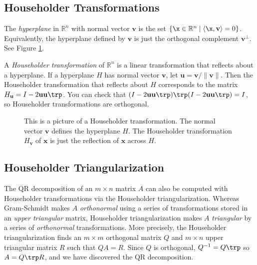 \subsection*{Householder Transformations}
The \emph{hyperplane} in $\mathbb{R}^n$ with normal vector $\mathbf{v}$ is the set $\{ \x \in \mathbb{R}^n \mid \langle \x, \mathbf{v} \rangle = 0 \}$. 
Equivalently, the hyperplane defined by $\mathbf{v}$ is just the orthogonal complement $\mathbf{v}^{\perp}$. 
See Figure \ref{fig:Householder_reflector}.

A \emph{Householder transformation} of $\mathbb{R}^n$ is a linear transformation that reflects about a hyperplane. 
If a hyperplane $H$ has normal vector $\mathbf{v}$, let $\mathbf{u} = \mathbf{v}/\|\mathbf{v}\|$. 
Then the Householder transformation that reflects about $H$ corresponds to the matrix $H_{\mathbf{u}} = I - 2 \mathbf{u}\mathbf{u}\trp$. 
You can check that $(I - 2 \mathbf{u}\mathbf{u}\trp)\trp(I - 2 \mathbf{u}\mathbf{u}\trp)=I$, so Householder transformations are orthogonal.

\begin{figure}
\begin{center}
\end{center}
\caption{This is a picture of a Householder transformation. 
The normal vector $\mathbf{v}$ defines the hyperplane $H$. 
The Householder transformation $H_{\mathbf{v}}$ of $\mathbf{x}$ is just the reflection of $\mathbf{x}$ across $H$.}
\label{fig:Householder_reflector}
\end{figure}

\subsection*{Householder Triangularization}
The QR decomposition of an $m \times n$ matrix $A$ can also be computed with Householder transformations via the Householder triangularization.
Whereas Gram-Schmidt makes $A$ \emph{orthonormal} using a series of transformations stored in an \emph{upper triangular} matrix, Householder triangularization makes $A$ \emph{triangular} by a series of \emph{orthonormal} transformations.
More precisely, the Householder triangularization finds an $m \times m$ orthogonal matrix $Q$ and $m \times n$ upper triangular matrix $R$ such that $QA = R$. 
Since $Q$ is orthogonal, $Q^{-1}=Q\trp$ so $A = Q\trp R$, and we have discovered the QR decomposition.

